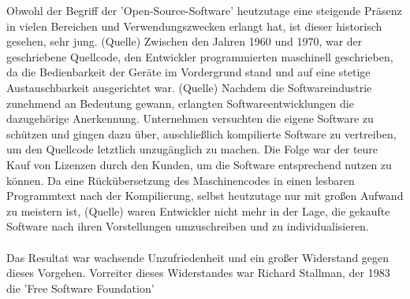 Obwohl der Begriff der 'Open-Source-Software' heutzutage eine steigende Präsenz in vielen Bereichen und Verwendungszwecken erlangt hat, ist dieser historisch gesehen, sehr jung. (Quelle) Zwischen den Jahren 1960 und 1970, war der geschriebene Quellcode, den Entwickler programmierten maschinell geschrieben, da die Bedienbarkeit der Geräte im Vordergrund stand und auf eine stetige Austauschbarkeit ausgerichtet war. (Quelle) Nachdem die Softwareindustrie zunehmend an Bedeutung gewann, erlangten Softwareentwicklungen die dazugehörige Anerkennung. Unternehmen versuchten die eigene Software zu schützen und gingen dazu über, auschließlich kompilierte Software zu vertreiben, um den Quellcode letztlich unzugänglich zu machen. Die Folge war der teure Kauf von Lizenzen durch den Kunden, um die Software entsprechend nutzen zu können. Da eine Rückübersetzung des Maschinencodes in einen lesbaren Programmtext nach der Kompilierung, selbst heutzutage nur mit großen Aufwand zu meistern ist, (Quelle) waren Entwickler nicht mehr in der Lage, die gekaufte Software nach ihren Vorstellungen umzuschreiben und zu individualisieren.\\\\ Das Resultat war wachsende Unzufriedenheit und ein großer Widerstand gegen dieses Vorgehen. Vorreiter dieses Widerstandes war Richard Stallman, der 1983 die 'Free Software Foundation'
